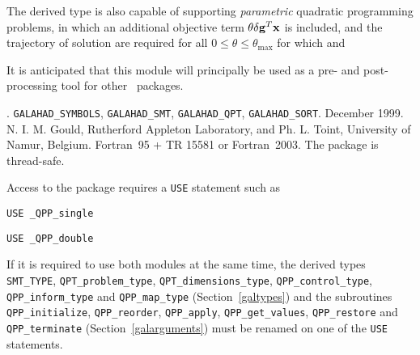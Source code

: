 \documentclass{galahad}
\newcommand{\packagename}{QPP}
\newcommand{\fullpackagename}{\libraryname\_\packagename}
\begin{document}
The derived type is also capable of supporting {\em parametric}
quadratic programming problems, in which an additional objective
term $\theta \delta {\mathbf{g}}^T {\mathbf{x}}$ is included, and the trajectory of
solution are required for all $0 \leq \theta \leq \theta_{\max}$
for which
and

It is anticipated that this module will principally be used as a pre- and
post-processing tool for other \galahad\ packages.


\galattributes
\galversions{\tt  \fullpackagename\_single, \fullpackagename\_double}.
\galuses
{\tt GALAHAD\_SY\-M\-BOLS},
{\tt GALAHAD\_SMT},
{\tt GALAHAD\_QPT},
{\tt GALAHAD\_SORT}.
\galdate December 1999.
\galorigin N. I. M. Gould, Rutherford Appleton Laboratory, and
Ph. L. Toint, University of Namur, Belgium.
\gallanguage Fortran~95 + TR 15581 or Fortran~2003.
The package is thread-safe.


\galhowto


Access to the package requires a {\tt USE} statement such as

\medskip{}

\hspace{8mm} {\tt USE \fullpackagename\_single}

\medskip{}

\hspace{8mm} {\tt USE  \fullpackagename\_double}

\medskip

\noindent
If it is required to use both modules at the same time, the derived types
{\tt SMT\_TYPE},
{\tt QPT\_problem\_type},
{\tt QPT\_dimensions\_type},
{\tt \packagename\_control\_type},
\sloppy
{\tt \packagename\_inform\_type}
and
{\tt \packagename\_map\_type}
(Section~\ref{galtypes})
and the subroutines
{\tt \packagename\_initialize},
{\tt \packagename\_reorder},
{\tt \packagename\_apply},
{\tt \packagename\_get\_values},
{\tt \packagename\_restore}
and
{\tt \packagename\_terminate}
(Section~\ref{galarguments})
must be renamed on one of the {\tt USE} statements.
\end{document}
